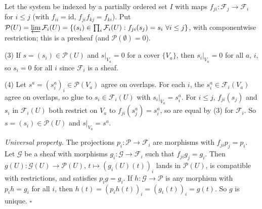 \documentclass[11pt]{article}
\begin{document}
\pf
Let the system be indexed by a partially ordered set $I$ with maps $f_{ji}\colon\mathcal F_j\to\mathcal F_i$ for $i\le j$ (with $f_{ii}=\mathrm{id}$, $f_{ji}f_{kj}=f_{ki}$). Put $\mathcal P(U)=\varprojlim\mathcal F_i(U)=\{(s_i)\in\prod_i\mathcal F_i(U): f_{ji}(s_j)=s_i\ \forall i\le j\}$, with componentwise restriction; this is a presheaf (and $\mathcal P(\emptyset)=0$).

(3) If $s=(s_i)\in\mathcal P(U)$ and $s|_{V_a}=0$ for a cover $\{V_a\}$, then $s_i|_{V_a}=0$ for all $a$, $i$, so $s_i=0$ for all $i$ since $\mathcal F_i$ is a sheaf.

(4) Let $s^a=(s^a_i)_i\in\mathcal P(V_a)$ agree on overlaps. For each $i$, the $s^a_i\in\mathcal F_i(V_a)$ agree on overlaps, so glue to $s_i\in\mathcal F_i(U)$ with $s_i|_{V_a}=s^a_i$. For $i\le j$, $f_{ji}(s_j)$ and $s_i$ in $\mathcal F_i(U)$ both restrict on $V_a$ to $f_{ji}(s^a_j)=s^a_i$, so are equal by (3) for $\mathcal F_i$. So $s=(s_i)\in\mathcal P(U)$ and $s|_{V_a}=s^a$.

\emph{Universal property.} The projections $p_i\colon\mathcal P\to\mathcal F_i$ are morphisms with $f_{ji}p_j=p_i$. Let $\mathcal G$ be a sheaf with morphisms $g_i\colon\mathcal G\to\mathcal F_i$ such that $f_{ji}g_j=g_i$. Then $g(U)\colon\mathcal G(U)\to\mathcal P(U)$, $t\mapsto(g_i(U)(t))_i$ lands in $\mathcal P(U)$, is compatible with restrictions, and satisfies $p_ig=g_i$. If $h\colon\mathcal G\to\mathcal P$ is any morphism with $p_ih=g_i$ for all $i$, then $h(t)=(p_ih(t))_i=(g_i(t))_i=g(t)$. So $g$ is unique. \hfill$\square$
\end{document}
